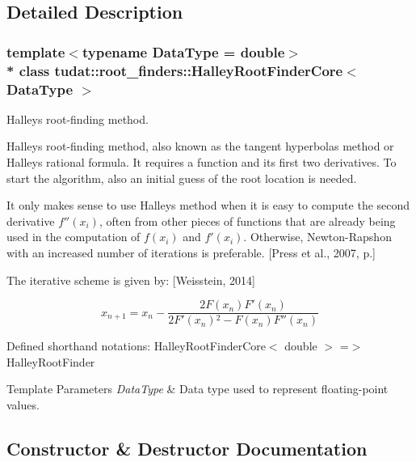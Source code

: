 \subsection{Detailed Description}
\subsubsection*{template$<$typename Data\+Type = double$>$\\*
class tudat\+::root\+\_\+finders\+::\+Halley\+Root\+Finder\+Core$<$ Data\+Type $>$}

Halley\textquotesingle{}s root-\/finding method. 

Halley\textquotesingle{}s root-\/finding method, also known as the tangent hyperbolas method or Halley\textquotesingle{}s rational formula. It requires a function and its first two derivatives. To start the algorithm, also an initial guess of the root location is needed.

It only makes sense to use Halley\textquotesingle{}s method when it is easy to compute the second derivative $f''(x_i)$, often from other pieces of functions that are already being used in the computation of $f(x_i)$ and $f'(x_i)$. Otherwise, Newton-\/\+Rapshon with an increased number of iterations is preferable. \mbox{[}Press et al., 2007, p.\mbox{]}

The iterative scheme is given by\+: \mbox{[}Weisstein, 2014\mbox{]}

\[ x_{n+1} = x_n-\frac{2 F\left(x_n\right) F'\left(x_n\right)} {2 F'\left(x_n\right){}^2-F\left(x_n\right) F''\left(x_n\right)} \]

Defined shorthand notations\+: Halley\+Root\+Finder\+Core$<$ double $>$ =$>$ Halley\+Root\+Finder


\begin{DoxyTemplParams}{Template Parameters}
{\em Data\+Type} & Data type used to represent floating-\/point values. \\
\hline
\end{DoxyTemplParams}


\subsection{Constructor \& Destructor Documentation}
